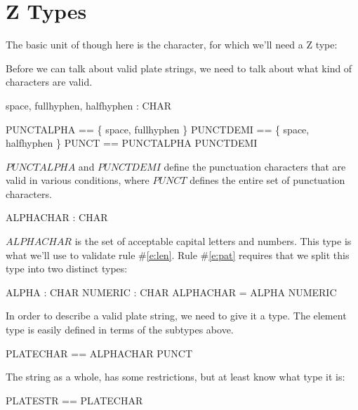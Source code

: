 \documentclass[11pt]{article}
\begin{document}
\section{Z Types}
\begin{spec}
  The basic unit of though here is the character, for which we'll need a Z type:

  \begin{zed}
    [CHAR]
  \end{zed}

  Before we can talk about valid plate strings, we need to talk about what kind of characters are
  valid.  

  \begin{axdef}
    space, fullhyphen, halfhyphen : CHAR
  \end{axdef}

  \begin{zed}
    PUNCTALPHA == \{ space, fullhyphen \} \also
    PUNCTDEMI == \{ space, halfhyphen \} \also
    PUNCT == PUNCTALPHA \cup PUNCTDEMI
  \end{zed}

  $PUNCTALPHA$ and $PUNCTDEMI$ define the punctuation characters that are valid in various
  conditions, where $PUNCT$ defines the entire set of punctuation characters.

  \begin{axdef}
    ALPHACHAR : \power CHAR
  \end{axdef}

  $ALPHACHAR$ is the set of acceptable capital letters and numbers.  This type is what we'll use to
  validate rule \#\ref{e:len}.  Rule \#\ref{e:pat} requires that we split this type into two
  distinct types:

  \begin{axdef}
    ALPHA : \power CHAR \also
    NUMERIC : \power CHAR \also
    \where
    ALPHACHAR = ALPHA \cup NUMERIC
  \end{axdef}

  In order to describe a valid plate string, we need to give it a type.  The element type is easily
  defined in terms of the subtypes above.

  \begin{zed}
    PLATECHAR == ALPHACHAR \cup PUNCT
  \end{zed}

  The string as a whole, has some restrictions, but at least know what type it is:

  \begin{zed}
    PLATESTR == \seq PLATECHAR
  \end{zed}


\end{spec}
\end{document}
